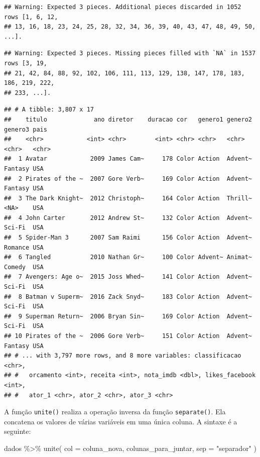 \documentclass[
]{book}
\newenvironment{Shaded}{\begin{snugshade}}{\end{snugshade}}
\newcommand{\AttributeTok}[1]{\textcolor[rgb]{0.77,0.63,0.00}{#1}}
\newcommand{\FunctionTok}[1]{\textcolor[rgb]{0.00,0.00,0.00}{#1}}
\newcommand{\NormalTok}[1]{#1}
\newcommand{\SpecialCharTok}[1]{\textcolor[rgb]{0.00,0.00,0.00}{#1}}
\newcommand{\StringTok}[1]{\textcolor[rgb]{0.31,0.60,0.02}{#1}}
\begin{document}
\begin{verbatim}
## Warning: Expected 3 pieces. Additional pieces discarded in 1052 rows [1, 6, 12,
## 13, 16, 18, 23, 24, 25, 28, 32, 34, 36, 39, 40, 43, 47, 48, 49, 50, ...].
\end{verbatim}

\begin{verbatim}
## Warning: Expected 3 pieces. Missing pieces filled with `NA` in 1537 rows [3, 19,
## 21, 42, 84, 88, 92, 102, 106, 111, 113, 129, 138, 147, 178, 183, 186, 219, 222,
## 233, ...].
\end{verbatim}

\begin{verbatim}
## # A tibble: 3,807 x 17
##    titulo             ano diretor    duracao cor   genero1 genero2 genero3 pais 
##    <chr>            <int> <chr>        <int> <chr> <chr>   <chr>   <chr>   <chr>
##  1 Avatar            2009 James Cam~     178 Color Action  Advent~ Fantasy USA  
##  2 Pirates of the ~  2007 Gore Verb~     169 Color Action  Advent~ Fantasy USA  
##  3 The Dark Knight~  2012 Christoph~     164 Color Action  Thrill~ <NA>    USA  
##  4 John Carter       2012 Andrew St~     132 Color Action  Advent~ Sci-Fi  USA  
##  5 Spider-Man 3      2007 Sam Raimi      156 Color Action  Advent~ Romance USA  
##  6 Tangled           2010 Nathan Gr~     100 Color Advent~ Animat~ Comedy  USA  
##  7 Avengers: Age o~  2015 Joss Whed~     141 Color Action  Advent~ Sci-Fi  USA  
##  8 Batman v Superm~  2016 Zack Snyd~     183 Color Action  Advent~ Sci-Fi  USA  
##  9 Superman Return~  2006 Bryan Sin~     169 Color Action  Advent~ Sci-Fi  USA  
## 10 Pirates of the ~  2006 Gore Verb~     151 Color Action  Advent~ Fantasy USA  
## # ... with 3,797 more rows, and 8 more variables: classificacao <chr>,
## #   orcamento <int>, receita <int>, nota_imdb <dbl>, likes_facebook <int>,
## #   ator_1 <chr>, ator_2 <chr>, ator_3 <chr>
\end{verbatim}

A função \texttt{unite()} realiza a operação inversa da função \texttt{separate()}. Ela concatena os valores de várias variáveis em uma única coluna. A sintaxe é a seguinte:

\begin{Shaded}
\begin{Highlighting}[]
\NormalTok{dados }\SpecialCharTok{\%\textgreater{}\%} 
  \FunctionTok{unite}\NormalTok{(}
    \AttributeTok{col =}\NormalTok{ coluna\_nova, }
\NormalTok{    colunas\_para\_juntar, }
    \AttributeTok{sep =} \StringTok{"separador"} 
\NormalTok{  )}
\end{Highlighting}
\end{Shaded}
\end{document}
